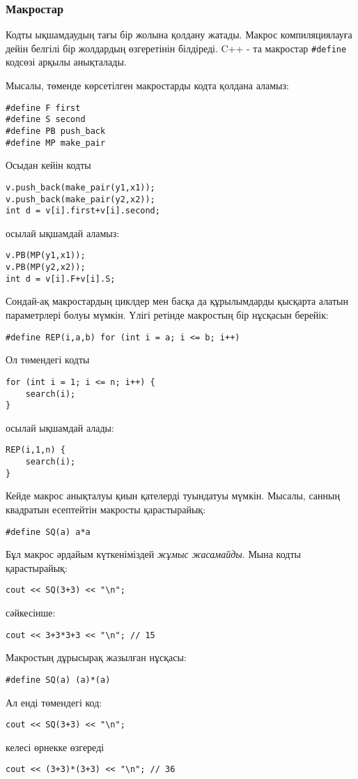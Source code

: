 \subsubsection{Макростар}
Кодты ықшамдаудың тағы бір жолына
 қолдану жатады.
Макрос компиляциялауға дейін белгілі бір жолдардың 
өзгеретінін білдіреді.
C++ - та макростар \texttt{\#define} кодсөзі 
арқылы анықталады.

Мысалы, төменде көрсетілген макростарды кодта қолдана аламыз:
\begin{lstlisting}
#define F first
#define S second
#define PB push_back
#define MP make_pair
\end{lstlisting}
Осыдан кейін кодты
\begin{lstlisting}
v.push_back(make_pair(y1,x1));
v.push_back(make_pair(y2,x2));
int d = v[i].first+v[i].second;
\end{lstlisting}
осылай ықшамдай аламыз:
\begin{lstlisting}
v.PB(MP(y1,x1));
v.PB(MP(y2,x2));
int d = v[i].F+v[i].S;
\end{lstlisting}

Сондай-ақ макростардың циклдер мен басқа да
құрылымдарды қысқарта алатын параметрлері болуы мүмкін.
Үлігі ретінде макростың бір нұсқасын берейік:
\begin{lstlisting}
#define REP(i,a,b) for (int i = a; i <= b; i++)
\end{lstlisting}
Ол төмендегі кодты
\begin{lstlisting}
for (int i = 1; i <= n; i++) {
    search(i);
}
\end{lstlisting}
осылай ықшамдай алады:
\begin{lstlisting}
REP(i,1,n) {
    search(i);
}
\end{lstlisting}

Кейде макрос анықталуы қиын қателерді туындатуы мүмкін.
Мысалы, санның квадратын есептейтін макросты қарастырайық:
\begin{lstlisting}
#define SQ(a) a*a
\end{lstlisting}
Бұл макрос әрдайым күткеніміздей \emph{жұмыс жасамайды}.
Мына кодты қарастырайық:
\begin{lstlisting}
cout << SQ(3+3) << "\n";
\end{lstlisting}
сәйкесінше:
\begin{lstlisting}
cout << 3+3*3+3 << "\n"; // 15
\end{lstlisting}

Макростың дұрысырақ жазылған нұсқасы:
\begin{lstlisting}
#define SQ(a) (a)*(a)
\end{lstlisting}
Ал енді төмендегі код:
\begin{lstlisting}
cout << SQ(3+3) << "\n";
\end{lstlisting}
келесі өрнекке өзгереді
\begin{lstlisting}
cout << (3+3)*(3+3) << "\n"; // 36
\end{lstlisting}


